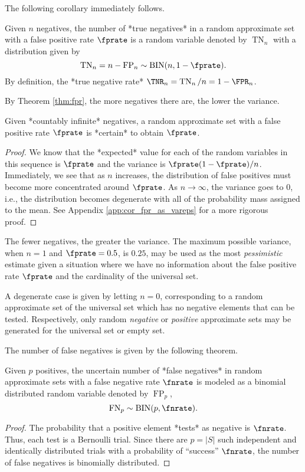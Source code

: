 \documentclass[
]{article}
\begin{document}
The following corollary immediately follows.

\begin{corollary}
    \label{cor:tnbinom}
    Given $n$ negatives, the number of *true negatives* in a random approximate
    set with a false positive rate $\fprate$ is a random variable denoted by
    $\operatorname{TN}_n$ with a distribution given by
    $$
    \operatorname{TN}_n = n - \operatorname{FP}_n \sim \operatorname{BIN}(n, 1-\fprate).
    $$
    By definition, the *true negative rate* $\TNR_n = \operatorname{TN}_n / n = 1 - \FPR_n$.
\end{corollary}

By Theorem \ref{thm:fpr}, the more negatives there are, the lower the
variance.

\begin{corollary}
\label{cor:fpr_as_vareps}
    Given *countably infinite* negatives, a random approximate set with a false positive rate $\fprate$ is *certain* to obtain $\fprate$.
\end{corollary}
\begin{proof}
We know that the *expected* value for each of the random variables in this
sequence is $\fprate$ and the variance is $\fprate(1-\fprate)/n$.
Immediately, we see that as $n$ increases, the distribution of false positives
must become more concentrated around $\fprate$.
As $n \to \infty$, the variance goes to $0$, i.e., the distribution becomes
degenerate with all of the probability mass assigned to the mean.
See Appendix \ref{app:cor_fpr_as_vareps} for a more rigorous proof.
\end{proof}

The fewer negatives, the greater the variance. The maximum possible
variance, when \(n=1\) and \(\fprate = 0.5\), is \(0.25\), may be used
as the most \emph{pessimistic} estimate given a situation where we have
no information about the false positive rate \(\fprate\) and the
cardinality of the universal set.

A degenerate case is given by letting \(n = 0\), corresponding to a
random approximate set of the universal set which has no negative
elements that can be tested. Respectively, only random \emph{negative}
or \emph{positive} approximate sets may be generated for the universal
set or empty set.

The number of false negatives is given by the following theorem.

\begin{theorem}
\label{thm:fnbinom}
Given $p$ positives, the uncertain number of *false negatives* in random approximate sets with a false negative rate $\fnrate$ is modeled as a binomial distributed random variable denoted by $\operatorname{FP}_p$,
$$
    \operatorname{FN}_p \sim \operatorname{BIN}(p, \fnrate).
$$
\end{theorem}
\begin{proof}
The probability that a positive element *tests* as negative is $\fnrate$.
Thus, each test is a Bernoulli trial.
Since there are $p = |S|$ such independent and identically distributed trials
with a probability of ``success'' $\fnrate$, the number of false negatives is
binomially distributed.
\end{proof}
\end{document}
